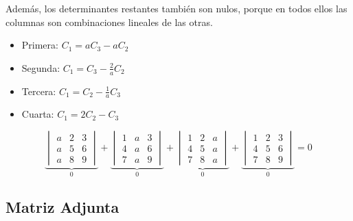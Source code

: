 \documentclass[a4paper,12pt]{article}
\begin{document}
\begin{ejercicio}[title=Ejercicio 33]
Además, los determinantes restantes también son nulos, porque en todos ellos las columnas son combinaciones lineales de las otras.
\begin{itemize}
    \item Primera: $C_1 = aC_3 - aC_2$
    \item Segunda: $C_1 = C_3 - \frac{2}{a}C_2$
    \item Tercera: $C_1 = C_2 - \frac{1}{a}C_3$
    \item Cuarta: $C_1 = 2C_2-C_3$
\end{itemize}
\[
\underbrace{
\begin{vmatrix}
a & 2 & 3\\
a & 5 & 6\\
a & 8 & 9
\end{vmatrix}
}_{0}
+
\underbrace{
\begin{vmatrix}
1 & a & 3\\
4 & a & 6\\
7 & a & 9
\end{vmatrix}
}_{0}
+
\underbrace{
\begin{vmatrix}
1 & 2 & a\\
4 & 5 & a\\
7 & 8 & a
\end{vmatrix}
}_{0}
+
\underbrace{
\begin{vmatrix}
1 & 2 & 3\\
4 & 5 & 6\\
7 & 8 & 9
\end{vmatrix}
}_{0}
= \boxed{0}
\]
\end{ejercicio}

\subsection{Matriz Adjunta}
\end{document}

